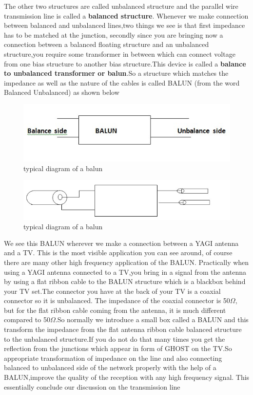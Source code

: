 The other two structures are called unbalanced structure and the parallel wire transmission line is called a \textbf{balanced structure}. Whenever we make connection between balanced and unbalanced lines,two things we see is that first impedance has to be matched at the junction, secondly since you are bringing now a connection between a balanced floating structure and an unbalanced structure,you require some transformer in between which can connect voltage from one bias structure to another bias structure.This device is called a \textbf{balance to unbalanced transformer or balun}.So a structure which matches the impedance as well as the nature of the cables is called BALUN (from the word Balanced Unbalanced) as shown below
\begin{figure}[h]
\centering
\includegraphics[width=1\linewidth]{./graphics/balun}
\caption{typical diagram of a balun}
\end{figure}
\begin{figure}[h]
\centering
\includegraphics[width=1\linewidth]{./graphics/balun2}
\caption{typical diagram of a balun}
\end{figure}

We see this BALUN wherever we make a connection between a YAGI antenna and a TV. This is the most visible application you can see around, of course there are many other high frequency application of the BALUN. Practically when using a YAGI antenna connected to a TV,you bring in a signal from the antenna by using a flat ribbon cable to the BALUN structure which is a blackbox behind your TV set.The connector you have at the back of your TV is a coaxial connector so it is unbalanced. The impedance of the coaxial connector is 50$\Omega$, but for the flat ribbon cable coming from the antenna, it is much different compared to 50$\Omega$.So normally we introduce a small box called a BALUN and this transform the impedance from the flat  antenna ribbon cable balanced structure to the unbalanced structure.If you do not do that many times you get  the reflection from the junctions which appear in form of GHOST on the TV.So appropriate transformation of impedance on the line and also connecting balanced to unbalanced side of the network properly with the help of a BALUN,improve the quality of the reception with any high frequency signal. This essentially conclude our discussion on the transmission line 
